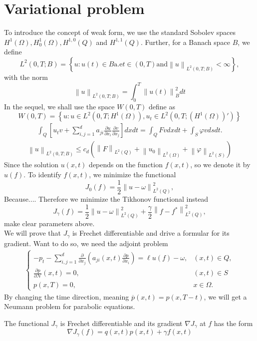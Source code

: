 \documentclass[]{article}
\begin{document}
\section{Variational problem}
To introduce the concept of weak form, we use the standard Sobolev spaces $H^1(\Omega), H^1_0(\Omega), H^{1, 0}(Q)$ and $H^{1, 1}(Q)$. Further, for a Banach space $B$, we define
$$L^2(0, T; B)=\left\{u:u(t)\in B \text{a.e} t\in (0, T) \text{and} \left\|u\right\|_{L^2(0, T; B)} <\infty \right\},$$
with the norm
$$\left\|u\right\|_{L^2(0, T; B)}=\int_0^T\left\|u(t)\right\|^2_Bdt$$
In the sequel, we shall use the space $W(0, T)$ define as
$$W(0, T)=\left\{u: u\in L^2(0, T; H^1(\Omega)), u_t\in L^2\left(0, T; \left(H^1(\Omega)\right)'\right) \right\}$$
\begin{align}
	\int_{Q}\left[u_tv+\sum_{i, j=1}^{d}a_{ji}\frac{\partial u}{\partial x_i}\frac{\partial v}{\partial x_j}\right]dxdt=\int_{Q}Fvdxdt+\int_{S}\varphi vdsdt.
\end{align}
\begin{align}
	\left\|u\right\|_{L^2(0, T; B)} \leq c_d \left(\left\|F\right\|_{L^2(Q)}+\left\|u_0\right\|_{L^2(\Omega)}+\left\|\varphi\right\|_{L^2(S)}\right)
\end{align}
Since the solution $u(x, t)$ depends on the function $f(x, t)$, so we denote it by $u(f)$. To identify $f(x, t)$, we minimize the functional
$$J_{0}(f)=\frac{1}{2}\left\|u-\omega\right\|_{L^2(Q)}^2,$$
Because.... Therefore we minimize the Tikhonov functional instead
$$J_{\gamma}(f)=\frac{1}{2}\left\|u-\omega\right\|_{L^2(Q)}^2+\frac{\gamma}{2}\left\|f-f^*\right\|_{L^2(Q)}^2,$$
make clear parameters above.\\
We will prove that $J_\gamma$ is Frechet differentiable and drive a formular for its gradient. Want to do so, we need the adjoint problem
\begin{align}
	\begin{cases}
		-p_t-\sum_{i, j=1}^{d}\frac{\partial}{\partial x_j}\left(a_{ji}(x, t)\frac{\partial p}{\partial x_i}\right)=\ell u(f)-\omega, & (x, t)\in Q,\\
		\frac{\partial p}{\partial \mathcal{N}}(x, t)=0, & (x, t)\in S\\
		p(x, T)=0, & x\in \Omega.
	\end{cases}
\end{align}
By changing the time direction, meaning $\overline{p}(x, t)=p(x, T-t)$, we will get a Neumann problem for parabolic equations.
\begin{dl}
	The functional $J_\gamma$ is Frechet differentiable and its gradient $\nabla J_\gamma$ at $f$ has the form 
	$$\nabla J_\gamma(f)=q(x, t)p(x, t)+\gamma f(x, t)$$
\end{dl}
\end{document}
